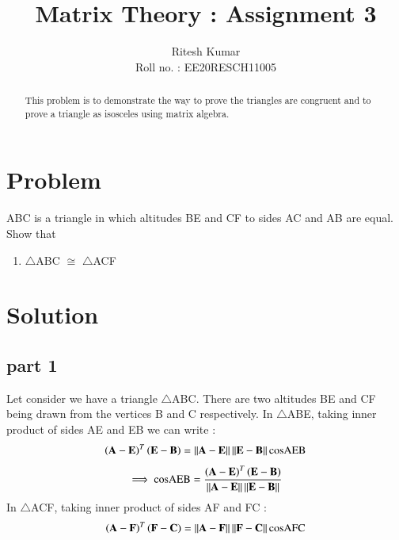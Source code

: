 \documentclass[journal,12pt,twocolumn]{IEEEtran}
\begin{document}
     \def\rightbox#1{\makebox[0in][r]{#1}}
     \def\centbox#1{\makebox[0in]{#1}}
     \def\topbox#1{\raisebox{-\baselineskip}[0in][0in]{#1}}
     \def\midbox#1{\raisebox{-0.5\baselineskip}[0in][0in]{#1}}
\vspace{3cm}
\title{ Matrix Theory : Assignment 3 }
\author{Ritesh Kumar \\ Roll no. : EE20RESCH11005 }
\maketitle
\newpage
\bigskip
\renewcommand{\thefigure}{\theenumi}
\renewcommand{\thetable}{\theenumi}
\begin{abstract}
This problem is to demonstrate the way to prove the triangles are congruent and to prove a triangle as isosceles using matrix algebra.
\end{abstract}

\section{Problem}
ABC is a triangle in which altitudes BE and CF to sides AC and AB are equal. Show that 
\begin{enumerate}
	\item $\triangle$ABC $\cong$ $\triangle$ACF 
\end{enumerate}
\section{Solution}
\subsection{part 1}
Let consider we have a triangle $\triangle$ABC. There are two altitudes BE and CF being  drawn from the vertices B and C respectively. \newline
 In $\triangle$ABE, taking inner product of sides  AE and EB we can write :
\begin{align}
\left( \mathbf{A-E} \right)^T \left( \mathbf{E - B} \right) = \left\lVert\mathbf{A - E}\right\rVert \left\lVert\mathbf{ E - B}\right\rVert \text{cosAEB}
\end{align}
\begin{align}
\implies \text{cosAEB} = \frac{\left( \mathbf{A-E} \right)^T  \left( \mathbf{E - B } \right)}{\left\lVert\mathbf{A - E}\right\rVert \left\lVert\mathbf{E - B}\right\rVert}
\end{align}
In $\triangle$ACF, taking inner product of sides AF and FC :
\begin{align}
\left( \mathbf{A-F} \right)^T \left( \mathbf{F - C} \right) = \left\lVert\mathbf{A - F}\right\rVert \left\lVert\mathbf{ F - C}\right\rVert \text{cosAFC}
\end{align}
\end{document}
